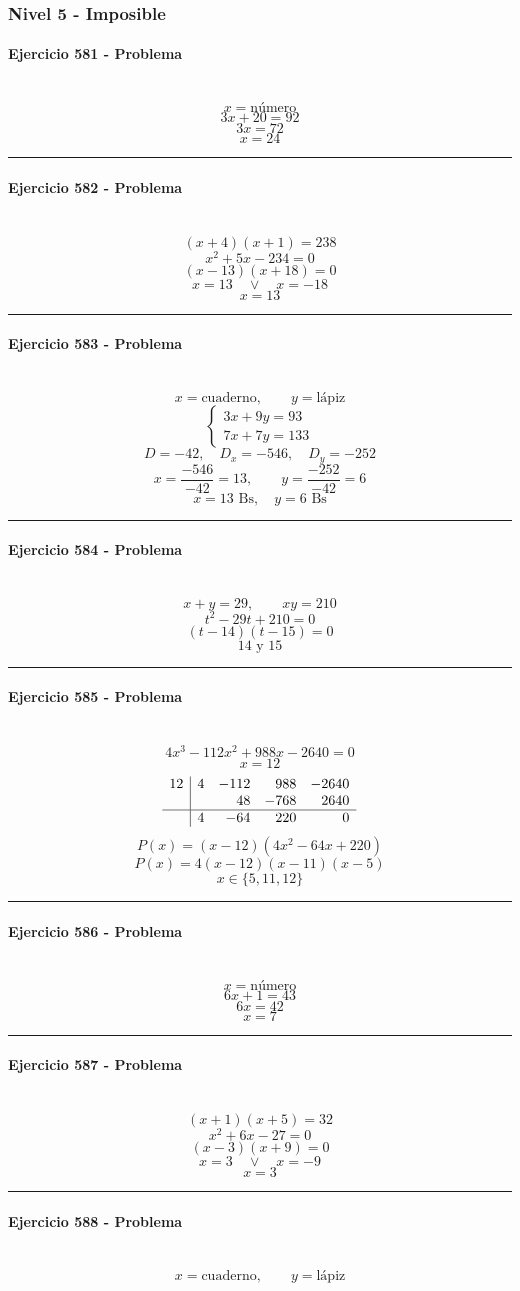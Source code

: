 \documentclass[10pt,a4paper]{article}
\newcommand{\res}[1]{\paragraph{#1}\mbox{}\\[-1.2em]}
\begin{document}
\subsubsection*{Nivel 5 - Imposible}
\res{Ejercicio 581 - Problema}
\[ x=\text{número} \]
\[ 3x+20=92 \]
\[ 3x=72 \]
\[ \boxed{x=24} \]
\vspace{1mm}\hrule\vspace{2mm}
\res{Ejercicio 582 - Problema}
\[ (x+4)(x+1)=238 \]
\[ x^{2} + 5 x - 234=0 \]
\[ (x-13)(x+18)=0 \]
\[ x=13\quad \vee \quad x=-18 \]
\[ \boxed{x=13} \]
\vspace{1mm}\hrule\vspace{2mm}
\res{Ejercicio 583 - Problema}
\[ x=\text{cuaderno},\qquad y=\text{lápiz} \]
\[ \begin{cases}3x+9y=93\\7x+7y=133\end{cases} \]
\[ D=-42,\quad D_x=-546,\quad D_y=-252 \]
\[ x=\frac{-546}{-42}=13,\qquad y=\frac{-252}{-42}=6 \]
\[ \boxed{x=13\text{ Bs},\quad y=6\text{ Bs}} \]
\vspace{1mm}\hrule\vspace{2mm}
\res{Ejercicio 584 - Problema}
\[ x+y=29,\qquad xy=210 \]
\[ t^2-29t+210=0 \]
\[ (t-14)(t-15)=0 \]
\[ \boxed{14\text{ y }15} \]
\vspace{1mm}\hrule\vspace{2mm}
\res{Ejercicio 585 - Problema}
\[ 4 x^{3} - 112 x^{2} + 988 x - 2640=0 \]
\[ x=12 \]
\[\begin{array}{r|rrrr}12 & 4 & -112 & 988 & -2640\\  &  & 48 & -768 & 2640\\\hline  & 4 & -64 & 220 & 0\end{array}\]
\[ P(x)=(x-12)(4 x^{2} - 64 x + 220) \]
\[ P(x)=4(x-12)(x-11)(x-5) \]
\[ \boxed{x\in\{5,11,12\}} \]
\vspace{1mm}\hrule\vspace{2mm}
\res{Ejercicio 586 - Problema}
\[ x=\text{número} \]
\[ 6x+1=43 \]
\[ 6x=42 \]
\[ \boxed{x=7} \]
\vspace{1mm}\hrule\vspace{2mm}
\res{Ejercicio 587 - Problema}
\[ (x+1)(x+5)=32 \]
\[ x^{2} + 6 x - 27=0 \]
\[ (x-3)(x+9)=0 \]
\[ x=3\quad \vee \quad x=-9 \]
\[ \boxed{x=3} \]
\vspace{1mm}\hrule\vspace{2mm}
\res{Ejercicio 588 - Problema}
\[ x=\text{cuaderno},\qquad y=\text{lápiz} \]
\end{document}
